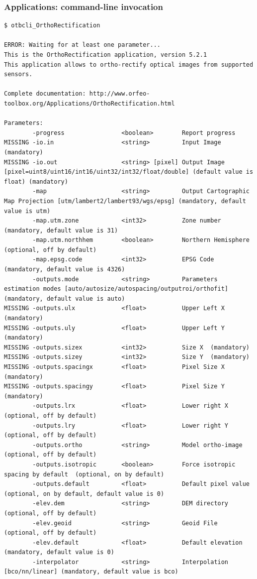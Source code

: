 \documentclass[8pt]{beamer}
\begin{document}
\begin{frame}[fragile]
\frametitle{Applications: command-line invocation}
\begin{scriptsize}
\vspace{-0.5cm}\begin{verbatim}
$ otbcli_OrthoRectification 

ERROR: Waiting for at least one parameter...
This is the OrthoRectification application, version 5.2.1
This application allows to ortho-rectify optical images from supported sensors.

Complete documentation: http://www.orfeo-toolbox.org/Applications/OrthoRectification.html

Parameters: 
        -progress                <boolean>        Report progress 
MISSING -io.in                   <string>         Input Image  (mandatory)
MISSING -io.out                  <string> [pixel] Output Image  [pixel=uint8/uint16/int16/uint32/int32/float/double] (default value is float) (mandatory)
        -map                     <string>         Output Cartographic Map Projection [utm/lambert2/lambert93/wgs/epsg] (mandatory, default value is utm)
        -map.utm.zone            <int32>          Zone number  (mandatory, default value is 31)
        -map.utm.northhem        <boolean>        Northern Hemisphere  (optional, off by default)
        -map.epsg.code           <int32>          EPSG Code  (mandatory, default value is 4326)
        -outputs.mode            <string>         Parameters estimation modes [auto/autosize/autospacing/outputroi/orthofit] (mandatory, default value is auto)
MISSING -outputs.ulx             <float>          Upper Left X  (mandatory)
MISSING -outputs.uly             <float>          Upper Left Y  (mandatory)
MISSING -outputs.sizex           <int32>          Size X  (mandatory)
MISSING -outputs.sizey           <int32>          Size Y  (mandatory)
MISSING -outputs.spacingx        <float>          Pixel Size X  (mandatory)
MISSING -outputs.spacingy        <float>          Pixel Size Y  (mandatory)
        -outputs.lrx             <float>          Lower right X  (optional, off by default)
        -outputs.lry             <float>          Lower right Y  (optional, off by default)
        -outputs.ortho           <string>         Model ortho-image  (optional, off by default)
        -outputs.isotropic       <boolean>        Force isotropic spacing by default  (optional, on by default)
        -outputs.default         <float>          Default pixel value  (optional, on by default, default value is 0)
        -elev.dem                <string>         DEM directory  (optional, off by default)
        -elev.geoid              <string>         Geoid File  (optional, off by default)
        -elev.default            <float>          Default elevation  (mandatory, default value is 0)
        -interpolator            <string>         Interpolation [bco/nn/linear] (mandatory, default value is bco)
\end{verbatim}
\end{scriptsize}
\end{frame}
\end{document}
